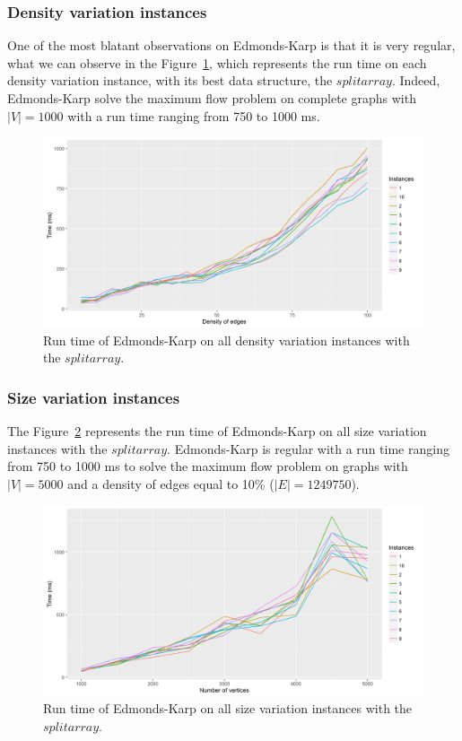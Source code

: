 \subsubsection{Density variation instances}
One of the most blatant observations on Edmonds-Karp is that it is very regular, what we can observe in the Figure~\ref{fig:EKmean}, which represents the run time on each density variation instance, with its best data structure, the $split array$. Indeed, Edmonds-Karp solve the maximum flow problem on complete graphs with $|V|=1000$ with a run time ranging from 750 to 1000 ms.
\begin{figure}[H]
\begin{center}
\includegraphics[scale=0.5]{images/results/EKmean.png}
\caption{Run time of Edmonds-Karp on all density variation instances with the $split array$.}
\label{fig:EKmean}
\end{center}
\end{figure}
\subsubsection{Size variation instances}
The Figure~\ref{fig:EKmeansize} represents the run time of Edmonds-Karp on all size variation instances with the $split array$. Edmonds-Karp is regular with a run time ranging from 750 to 1000 ms to solve the maximum flow problem on graphs with $|V|=5000$ and a density of edges equal to 10\% ($|E|=1249750$).
\begin{figure}[H]
\begin{center}
\includegraphics[scale=0.5]{images/results/EKmeansize2.png}
\caption{Run time of Edmonds-Karp on all size variation instances with the $split array$.}
\label{fig:EKmeansize}
\end{center}
\end{figure}
